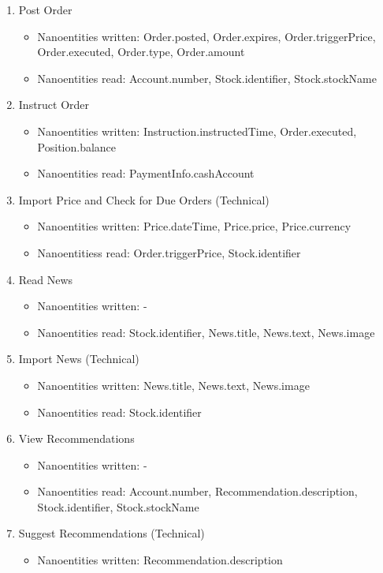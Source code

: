 \begin{enumerate}
\item Post Order
	\begin{itemize}
	\item Nanoentities written: Order.posted,  Order.expires, Order.triggerPrice, Order.executed, Order.type, Order.amount
	\item Nanoentities read: Account.number, Stock.identifier, Stock.stockName
	\end{itemize}
\item Instruct Order
	\begin{itemize}
	\item Nanoentities written: Instruction.instructedTime, Order.executed, Position.balance
	\item Nanoentities read: PaymentInfo.cashAccount
	\end{itemize}
\item Import Price and Check for Due Orders (Technical)
	\begin{itemize}
	\item Nanoentities written: Price.dateTime, Price.price, Price.currency
	\item Nanoentitiess read: Order.triggerPrice, Stock.identifier
	\end{itemize}
\item Read News
	\begin{itemize}
	\item Nanoentities written: - 
	\item Nanoentities read: Stock.identifier, News.title, News.text, News.image
	\end{itemize}
\item Import News (Technical)
	\begin{itemize}
	\item Nanoentities written: News.title, News.text, News.image
	\item Nanoentities read: Stock.identifier
	\end{itemize}
\item View Recommendations
	\begin{itemize}
	\item Nanoentities written: -
	\item Nanoentities read: Account.number, Recommendation.description, Stock.identifier, Stock.stockName
	\end{itemize}
\item Suggest Recommendations (Technical)
	\begin{itemize}
	\item Nanoentities written: Recommendation.description

\end{itemize}
\end{enumerate}
